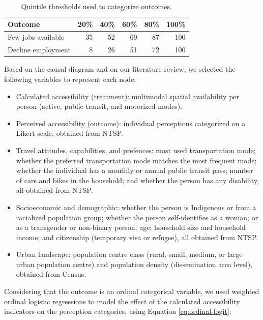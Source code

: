 \documentclass[preprint, 3p,
authoryear]{elsarticle} %
\providecommand{\tightlist}{%
  \setlength{\itemsep}{0pt}\setlength{\parskip}{0pt}}
\begin{document}
\begin{table}
\centering
\caption{\label{tab:outcomes-quintiles}\label{tab:outcomes_quintiles}Quintile thresholds used to categorize outcomes.}
\centering
\fontsize{10}{12}\selectfont
\begin{tabular}[t]{lrrrrr}
\toprule
Outcome & 20\% & 40\% & 60\% & 80\% & 100\%\\
\midrule
Few jobs available & 35 & 52 & 69 & 87 & 100\\
Decline employment & 8 & 26 & 51 & 72 & 100\\
\bottomrule
\end{tabular}
\end{table}

Based on the causal diagram and on our literature review, we selected
the following variables to represent each node:

\begin{itemize}
\tightlist
\item
  Calculated accessibility (treatment): multimodal spatial availability
  per person (active, public transit, and motorized modes).
\item
  Perceived accessibility (outcome): individual perceptions categorized
  on a Likert scale, obtained from NTSP.
\item
  Travel attitudes, capabilities, and prefences: most used
  transportation mode; whether the preferred transportation mode matches
  the most frequent mode; whether the individual has a monthly or annual
  public transit pass; number of cars and bikes in the household; and
  whether the person has any disability, all obtained from NTSP.
\item
  Socioeconomic and demographic: whether the person is Indigenous or
  from a racialized population group; whether the person self-identifies
  as a woman; or as a transgender or non-binary person; age; household
  size and household income; and citizenship (temporary visa or
  refugee), all obtained from NTSP.
\item
  Urban landscape: population centre class (rural, small, medium, or
  large urban population centre) and population density (dissemination
  area level), obtained from Census.
\end{itemize}

Considering that the outcome is an ordinal categorical variable, we used
weighted ordinal logistic regressions \citep{lumley2011} to model the
effect of the calculated accessibility indicators on the perception
categories, using Equation \ref{eq:ordinal-logit}:
\end{document}

